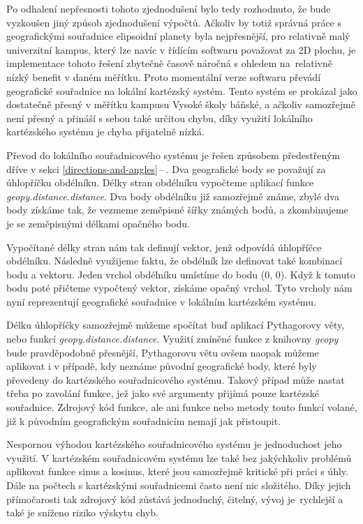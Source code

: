 \documentclass[czech, bachelor]{diploma}
\newcommand{\peteref}[1]{\ref{#1}\,--\,\nameref{#1}}
\begin{document}
Po odhalení nepřesnosti tohoto zjednodušení bylo tedy rozhodnuto, že bude vyzkoušen jiný způsob zjednodušení výpočtů. Ačkoliv by
totiž správná práce s geografickými souřadnice elipsoidní planety byla nejpřesnější, pro relativně malý univerzitní kampus, který
lze navíc v řídícím softwaru považovat za 2D plochu, je implementace tohoto řešení zbytečně časově náročná s ohledem na~relativně
nízký benefit v daném měřítku. Proto momentální verze softwaru převádí geografické souřadnice na lokální kartézský systém. Tento
systém se prokázal jako dostatečně přesný v měřítku kampusu Vysoké školy báňské, a ačkoliv samozřejmě není přesný a přináší
s sebou také určitou chybu, díky využití lokálního kartézského systému je chyba přijatelně nízká.

Převod do lokálního souřadnicového systému je řešen způsobem předestřeným dříve v sekci \peteref{directions-and-angles}. Dva
geografické body se považují za úhlopříčku obdélníku. Délky stran obdélníku vypočteme aplikací funkce
\emph{geopy.distance.distance}. Dva body obdélníku již samozřejmě známe, zbylé dva body získáme tak, že vezmeme zeměpisné šířky
známých bodů, a zkombinujeme je se zeměpisnými délkami opačného bodu.

Vypočítané délky stran nám tak definují vektor, jenž odpovídá úhlopříčce obdélníku. Následně využijeme faktu, že obdélník lze
definovat také kombinací bodu a vektoru. Jeden vrchol obdélníku umístíme do bodu (0, 0). Když k tomuto bodu poté přičteme
vypočtený vektor, získáme opačný vrchol. Tyto vrcholy nám nyní reprezentují geografické souřadnice v lokálním kartézském systému.

Délku úhlopříčky samozřejmě můžeme spočítat buď aplikací Pythagorovy věty, nebo funkcí \emph{geopy.distance.distance}. Využití
zmíněné funkce z knihovny \emph{geopy} bude pravděpodobně přesnější, Pythagorovu větu ovšem naopak můžeme aplikovat i v případě,
kdy neznáme původní geografické body, které byly převedeny do kartézského souřadnicového systému. Takový případ může nastat třeba
po zavolání funkce, jež jako své argumenty přijímá pouze kartézské souřadnice. Zdrojový kód funkce, ale ani funkce nebo metody
touto funkcí volané, již k původním geografickým souřadnicím nemají jak přistoupit.

Nespornou výhodou kartézského souřadnicového systému je jednoduchost jeho využití. V kartézském souřadnicovém systému lze také
bez jakýchkoliv problémů aplikovat funkce sinus a kosinus, které jsou samozřejmě kritické při práci s úhly. Dále na počtech
s kartézskými souřadnicemi často není nic složitého. Díky jejich přímočarosti tak zdrojový kód zůstává jednoduchý, čitelný,
vývoj je~rychlejší a také je sníženo riziko výskytu chyb.
\end{document}
